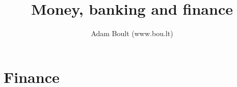 \documentclass[oneside]{book}
\begin{document}
\author{Adam Boult (www.bou.lt)}
\title{Money, banking and finance}
\maketitle

\setcounter{tocdepth}{0}
\tableofcontents



\part{Finance}





\end{document}
